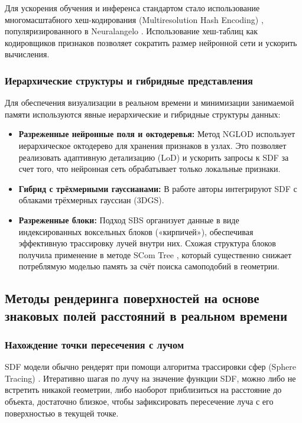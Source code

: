 Для ускорения обучения и инференса стандартом стало использование многомасштабного хеш-кодирования (Multiresolution Hash Encoding) \cite{muller2022instant}, популяризированного в Neuralangelo \cite{li2023neuralangelo}. Использование хеш-таблиц как кодировщиков признаков позволяет сократить размер нейронной сети и ускорить вычисления.

\subsubsection{Иерархические структуры и гибридные представления} \label{sssec:hierarchy}
Для обеспечения визуализации в реальном времени и минимизации занимаемой памяти используются явные иерархические и гибридные структуры данных:
\begin{itemize}
    \item \textbf{Разреженные нейронные поля и октодеревья:} Метод NGLOD \cite{takikawa2021neural} использует иерархическое октодерево для хранения признаков в узлах. Это позволяет реализовать адаптивную детализацию (LoD) и ускорить запросы к SDF за счет того, что нейронная сеть обрабатывает только локальные признаки.
    \item \textbf{Гибрид с трёхмерными гауссианами:} В работе \cite{yu2024gsdf3dgsmeetssdf} авторы интегрируют SDF с облаками трёхмерных гауссиан (3DGS)\cite{kerbl20233d}.
    \item \textbf{Разреженные блоки:} Подход SBS \cite{HanssonSoderlund2022SDF} организует данные в виде индексированных воксельных блоков («кирпичей»), обеспечивая эффективную трассировку лучей внутри них. Схожая структура блоков получила применение в методе SCom Tree \cite{garifullin2025compact}, который существенно снижает потреблямую моделью память за счёт поиска самоподобий в геометрии.
\end{itemize}

\subsection{Методы рендеринга поверхностей на основе знаковых полей расстояний в реальном времени}

\subsubsection{Нахождение точки пересечения с лучом}
SDF модели обычно рендерят при помощи алгоритма трассировки сфер (Sphere Tracing) \cite{hart1996sphere}. Итеративно шагая по лучу на значение функции SDF, можно либо не встретить никакой геометрии, либо наоборот приблизиться на расстояние до объекта, достаточно близкое, чтобы зафиксировать пересечение луча с его поверхностью в текущей точке.

